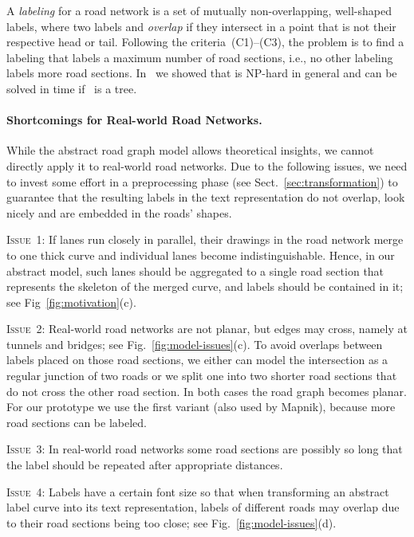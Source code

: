 \documentclass[a4paper,11pt]{article}
\newcommand{\ILong}{\textsc{Issue~3}\xspace}
\newcommand{\ILanes}{\textsc{Issue~1}\xspace}
\newcommand{\ICrossings}{\textsc{Issue~2}\xspace}
\newcommand{\IFatLabels}{\textsc{Issue~4}\xspace}
\begin{document}
A \emph{labeling}  for a road network is a set of mutually
non-overlapping, well-shaped labels, where two labels  and
 \emph{overlap} if they intersect in a point that is not their
respective head or tail. 
Following the criteria~(C1)--(C3), the problem
\MaxTotalCovering is to find a labeling  that labels a
maximum number of road sections, i.e., no other labeling 
labels more road sections.  In~\cite{rlTheory} we showed that
\MaxTotalCovering is NP-hard in general and can be solved in
 time if~ is a tree.










\paragraph{Shortcomings for Real-world Road Networks.}\label{sec:issues} 
While the abstract road graph model allows theoretical insights, we
cannot directly apply it to real-world road networks. Due to the following
issues, we need to invest some effort in a preprocessing phase (see Sect.~\ref{sec:transformation}) to guarantee that the resulting
labels in the text representation do not overlap, look nicely and are embedded in the roads' shapes. 




\ILanes: If lanes run closely in parallel, their drawings in the road
network merge to one thick curve and individual lanes become
indistinguishable. Hence, in our abstract model, such lanes should be aggregated to a single road
section that represents the skeleton of the merged curve, 
and labels should be contained in it; see Fig~\ref{fig:motivation}(c).

\ICrossings: Real-world road networks are not planar, but edges may cross,
namely at tunnels and bridges; see Fig.~\ref{fig:model-issues}(c).
To avoid
overlaps between labels placed on those road sections, we either can model
the intersection as a regular junction of two roads or
we split one into two shorter road sections that do not cross the other road section. In both
cases the road graph becomes planar. For our
prototype we use the first variant (also used by Mapnik), 
because more road sections can be labeled.

\ILong: In real-world road networks some road sections are possibly so long
that the label should be repeated after appropriate distances.

\IFatLabels: Labels have a certain
font size so that when transforming an abstract label curve
into its text representation, labels of different roads may overlap due to their road sections being too close; see Fig.~\ref{fig:model-issues}(d).
\end{document}
